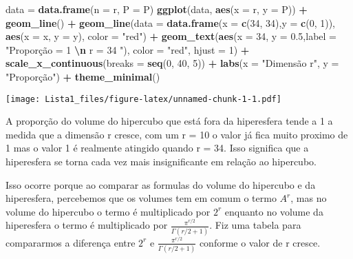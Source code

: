 \documentclass[
]{article}
\newenvironment{Shaded}{\begin{snugshade}}{\end{snugshade}}
\newcommand{\AttributeTok}[1]{\textcolor[rgb]{0.13,0.29,0.53}{#1}}
\newcommand{\DecValTok}[1]{\textcolor[rgb]{0.00,0.00,0.81}{#1}}
\newcommand{\FloatTok}[1]{\textcolor[rgb]{0.00,0.00,0.81}{#1}}
\newcommand{\FunctionTok}[1]{\textcolor[rgb]{0.13,0.29,0.53}{\textbf{#1}}}
\newcommand{\NormalTok}[1]{#1}
\newcommand{\OtherTok}[1]{\textcolor[rgb]{0.56,0.35,0.01}{#1}}
\newcommand{\SpecialCharTok}[1]{\textcolor[rgb]{0.81,0.36,0.00}{\textbf{#1}}}
\newcommand{\StringTok}[1]{\textcolor[rgb]{0.31,0.60,0.02}{#1}}
\begin{document}
\begin{Shaded}
\begin{Highlighting}[]
\NormalTok{data }\OtherTok{=} \FunctionTok{data.frame}\NormalTok{(}\AttributeTok{n =}\NormalTok{ r, }\AttributeTok{P =}\NormalTok{ P)}
\FunctionTok{ggplot}\NormalTok{(data, }\FunctionTok{aes}\NormalTok{(}\AttributeTok{x =}\NormalTok{ r, }\AttributeTok{y =}\NormalTok{ P)) }\SpecialCharTok{+}
  \FunctionTok{geom\_line}\NormalTok{() }\SpecialCharTok{+}
  \FunctionTok{geom\_line}\NormalTok{(}\AttributeTok{data =} \FunctionTok{data.frame}\NormalTok{(}\AttributeTok{x =} \FunctionTok{c}\NormalTok{(}\DecValTok{34}\NormalTok{, }\DecValTok{34}\NormalTok{),}\AttributeTok{y =} \FunctionTok{c}\NormalTok{(}\DecValTok{0}\NormalTok{, }\DecValTok{1}\NormalTok{)), }\FunctionTok{aes}\NormalTok{(}\AttributeTok{x =}\NormalTok{ x, }\AttributeTok{y =}\NormalTok{ y), }
            \AttributeTok{color =} \StringTok{"red"}\NormalTok{) }\SpecialCharTok{+}
  \FunctionTok{geom\_text}\NormalTok{(}\FunctionTok{aes}\NormalTok{(}\AttributeTok{x =} \DecValTok{34}\NormalTok{, }\AttributeTok{y =} \FloatTok{0.5}\NormalTok{,}\AttributeTok{label =} \StringTok{"Proporção = 1 }\SpecialCharTok{\textbackslash{}n}\StringTok{ r = 34            "}\NormalTok{), }
            \AttributeTok{color =} \StringTok{"red"}\NormalTok{, }\AttributeTok{hjust =} \DecValTok{1}\NormalTok{) }\SpecialCharTok{+}
  \FunctionTok{scale\_x\_continuous}\NormalTok{(}\AttributeTok{breaks =} \FunctionTok{seq}\NormalTok{(}\DecValTok{0}\NormalTok{, }\DecValTok{40}\NormalTok{, }\DecValTok{5}\NormalTok{)) }\SpecialCharTok{+}
  \FunctionTok{labs}\NormalTok{(}\AttributeTok{x =} \StringTok{"Dimensão r"}\NormalTok{,}
       \AttributeTok{y =} \StringTok{"Proporção"}\NormalTok{) }\SpecialCharTok{+} 
  \FunctionTok{theme\_minimal}\NormalTok{()}
\end{Highlighting}
\end{Shaded}

\texttt{[image: Lista1\_files/figure-latex/unnamed-chunk-1-1.pdf]}

A proporção do volume do hipercubo que está fora da hiperesfera tende a
1 a medida que a dimensão r cresce, com um r = 10 o valor já fica muito
proximo de 1 mas o valor 1 é realmente atingido quando r = 34. Isso
significa que a hiperesfera se torna cada vez mais insignificante em
relação ao hipercubo.

Isso ocorre porque ao comparar as formulas do volume do hipercubo e da
hiperesfera, percebemos que os volumes tem em comum o termo \(A^r\), mas
no volume do hipercubo o termo é multiplicado por \(2^r\) enquanto no
volume da hiperesfera o termo é multiplicado por
\(\frac{\pi^{r/2}}{\Gamma(r/2 + 1)}\). Fiz uma tabela para compararmos a
diferença entre \(2^r\) e \(\frac{\pi^{r/2}}{\Gamma(r/2 + 1)}\) conforme
o valor de r cresce.
\end{document}
